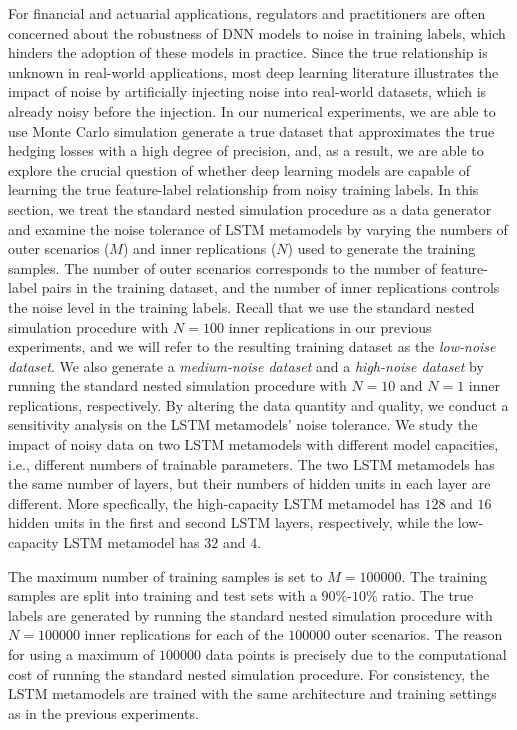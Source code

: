For financial and actuarial applications, regulators and practitioners are often concerned about the robustness of DNN models to noise in training labels, which hinders the adoption of these models in practice.
Since the true relationship is unknown in real-world applications, most deep learning literature illustrates the impact of noise by artificially injecting noise into real-world datasets, which is already noisy before the injection.
In our numerical experiments, we are able to use Monte Carlo simulation generate a true dataset that approximates the true hedging losses with a high degree of precision, and, as a result, we are able to explore the crucial question of whether deep learning models are capable of learning the true feature-label relationship from noisy training labels.
In this section, we treat the standard nested simulation procedure as a data generator and examine the noise tolerance of LSTM metamodels by varying the numbers of outer scenarios ($M$) and inner replications ($N$) used to generate the training samples.
The number of outer scenarios corresponds to the number of feature-label pairs in the training dataset, and the number of inner replications controls the noise level in the training labels.
Recall that we use the standard nested simulation procedure with $N=100$ inner replications in our previous experiments, and we will refer to the resulting training dataset as the \textit{low-noise dataset}.
We also generate a \textit{medium-noise dataset} and a \textit{high-noise dataset} by running the standard nested simulation procedure with $N=10$ and $N=1$ inner replications, respectively.
By altering the data quantity and quality, we conduct a sensitivity analysis on the LSTM metamodels' noise tolerance.
We study the impact of noisy data on two LSTM metamodels with different model capacities, i.e., different numbers of trainable parameters.
The two LSTM metamodels has the same number of layers, but their numbers of hidden units in each layer are different.
More specfically, the high-capacity LSTM metamodel has $128$ and $16$ hidden units in the first and second LSTM layers, respectively, while the low-capacity LSTM metamodel has $32$ and $4$.

The maximum number of training samples is set to $M = \num{100000}$.
The training samples are split into training and test sets with a $90\%$-$10\%$ ratio.
The true labels are generated by running the standard nested simulation procedure with $N=\num{100000}$ inner replications for each of the $\num{100000}$ outer scenarios.
The reason for using a maximum of $\num{100000}$ data points is precisely due to the computational cost of running the standard nested simulation procedure.
For consistency, the LSTM metamodels are trained with the same architecture and training settings as in the previous experiments.

